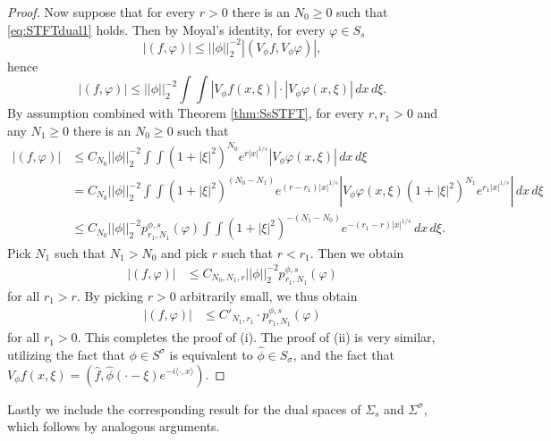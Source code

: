 \documentclass[11pt,a4paper,reqno]{amsart}
\numberwithin{equation}{section}
\theoremstyle{definition}
\theoremstyle{definition}
\begin{document}
\begin{proof}
Now suppose that for every $r>0$ there is an $N_0 \geq 0$ such that \eqref{eq:STFTdual1} holds. Then by Moyal's identity, for every $\varphi \in S_s $
\begin{equation*}
    |(f,\varphi)|\leq ||\phi||_2^{-2} |(V_\phi f, V_\phi \varphi)|, 
\end{equation*}
hence
\begin{equation*}
    |(f,\varphi)|\leq ||\phi||_2^{-2} \int \int |V_\phi f(x,\xi)|\cdot |V_\phi \varphi(x,\xi)| \, d x \, d \xi.
\end{equation*}
By assumption combined with Theorem \ref{thm:SsSTFT}, for every $r,r_1>0$ and any $N_1\geq 0$ there is an $N_0\geq 0$ such that
\begin{align*}
    |(f,\varphi)|&\leq C_{N_0}||\phi||_2^{-2} \int \int  (1+|\xi|^2)^{N_0} e^{r|x|^{1/s}}  |V_\phi\varphi(x,\xi)| \, d x \, d \xi \\
    &= C_{N_0}||\phi||_2^{-2} \int \int  (1+|\xi|^2)^{(N_0-N_1)} e^{(r-r_1)|x|^{1/s}}  \left|V_\phi\varphi(x,\xi)(1+|\xi|^2)^{N_1} e^{r_1|x|^{1/s}}\right| \, d x \, d \xi \\
    &\leq C_{N_0}||\phi||_2^{-2} p^{\phi,s}_{r_1,N_1}(\varphi)\int \int  (1+|\xi|^2)^{-(N_1-N_0)} e^{-(r_1-r)|x|^{1/s}} \, d x \, d \xi.
\end{align*}
Pick $N_1$ such that $N_1>N_0$ and pick $r$ such that $r<r_1$. Then we obtain
\begin{align*}
    |(f,\varphi)|&\leq   C_{N_0,N_1,r}||\phi||_2^{-2} p^{\phi,s}_{r_1,N_1}(\varphi)
\end{align*}
for all $r_1>r$. By picking $r>0$ arbitrarily small, we thus obtain
\begin{align*}
    |(f,\varphi)|&\leq   C'_{N_1,r_1}\cdot p^{\phi,s}_{r_1,N_1}(\varphi)
\end{align*}
for all $r_1>0$. This completes the proof of (i). The proof of (ii) is very similar, utilizing the fact that $\phi\in S^\sigma$ is equivalent to $\hat{\phi}\in S_\sigma $, and the fact that $V_\phi f(x,\xi) = (\hat{f},\hat{\phi}(\cdot-\xi)e^{-i\langle \cdot,x \rangle})$.    
    
\end{proof}
Lastly we include the corresponding result for the dual spaces of $\Sigma_s$ and $\Sigma^\sigma$, which follows by analogous arguments.
\end{document}
